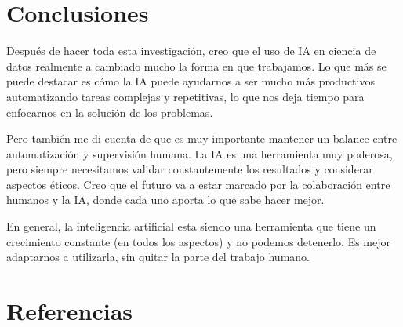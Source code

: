 \documentclass[11pt]{article}
\begin{document}
    \section*{Conclusiones}

    Despu\'es de hacer toda esta investigaci\'on, creo que el uso de IA en ciencia de datos realmente a cambiado mucho la forma en que trabajamos.
    Lo que m\'as se puede destacar es c\'omo la IA puede ayudarnos a ser mucho m\'as productivos automatizando tareas complejas y repetitivas, lo que nos deja tiempo para enfocarnos en la soluci\'on de los problemas.

    Pero tambi\'en me di cuenta de que es muy importante mantener un balance entre automatizaci\'on y supervisi\'on humana.
    La IA es una herramienta muy poderosa, pero siempre necesitamos validar constantemente los resultados y considerar aspectos \'eticos.
    Creo que el futuro va a estar marcado por la colaboraci\'on entre humanos y la IA, donde cada uno aporta lo que sabe hacer mejor.

    En general, la inteligencia artificial esta siendo una herramienta que tiene un crecimiento constante (en todos los aspectos) y no podemos detenerlo.
    Es mejor adaptarnos a utilizarla, sin quitar la parte del trabajo humano.

    \section*{Referencias}
\end{document}
